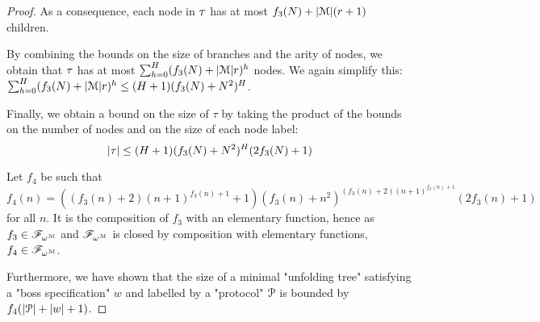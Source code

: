 \begin{proof}
	As a consequence, each node in $\tau$ has at most $f_3(N) + |\mathcal{M}|(r+1)$ children.
	
	By combining the bounds on the size of branches and the arity of nodes, we obtain that $\tau$ has at most $\sum_{h=0}^{H} (f_3(N) + |\mathcal{M}|r)^h$ nodes. We again simplify this: $\sum_{h=0}^{H} (f_3(N) + |\mathcal{M}|r)^h \leq (H+1)(f_3(N) + N^2)^H$.
	
	Finally, we obtain a bound on the size of $\tau$ by taking the product of the bounds on the number of nodes and on the size of each node label: 
	\[ |\tau| \leq  (H+1)(f_3(N) + N^2)^H (2f_3(N) +1)\]
	
	Let $f_4$ be such that $f_4(n) = ((f_3(n)+2)(n+1)^{f_3(n)+1} +1) (f_3(n) + n^2)^{(f_3(n)+2)(n+1)^{f_3(n)+1}}(2f_3(n) +1)$ for all $n$. It is the composition of $f_3$ with an elementary function, hence as $f_3 \in \mathscr{F}_{\omega^{\mathcal{M}}}$ and $\mathscr{F}_{\omega^{\mathcal{M}}}$ is closed by composition with elementary functions, $f_4 \in \mathscr{F}_{\omega^{\mathcal{M}}}$.
	
	Furthermore, we have shown that the size of a minimal "unfolding tree" satisfying a "boss specification" $w$ and labelled by a "protocol" $\mathcal{P}$ is bounded by $f_4(|\mathcal{P}| + |w| +1)$.
\end{proof}
